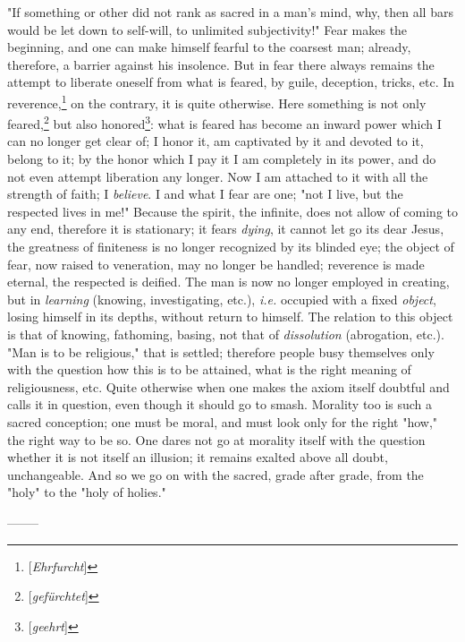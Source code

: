  "{}If something or other did not rank as sacred in a man's mind, why, then 
all bars would be let down to self-will, to unlimited subjectivity!"{} Fear 
makes the beginning, and one can make himself fearful to the coarsest man; 
already, therefore, a barrier against his insolence. But in fear there always 
remains the attempt to liberate oneself from what is feared, by guile, 
deception, tricks, etc. In reverence,\footnote{[\textit{Ehrfurcht}]} on the 
contrary, it is quite otherwise. Here something is not only 
feared,\footnote{[\textit{gef\"urchtet}]} but also 
honored\footnote{[\textit{geehrt}]}: what is feared has become an inward power 
which I can no longer get clear of; I honor it, am captivated by it and 
devoted to it, belong to it; by the honor which I pay it I am completely in 
its power, and do not even attempt liberation any longer. Now I am attached to 
it with all the strength of faith; I \textit{believe}. I and what I fear are 
one; "{}not I live, but the respected lives in me!"{} Because the spirit, the 
infinite, does not allow of coming to any end, therefore it is stationary; it 
fears \textit{dying}, it cannot let go its dear Jesus, the greatness of 
finiteness is no longer recognized by its blinded eye; the object of fear, now 
raised to veneration, may no longer be handled; reverence is made eternal, the 
respected is deified. The man is now no longer employed in creating, but in 
\textit{learning} (knowing, investigating, etc.), \textit{i.e.} occupied with 
a fixed \textit{object}, losing himself in its depths, without return to 
himself. The relation to this object is that of knowing, fathoming, basing, 
not that of \textit{dissolution} (abrogation, etc.). "{}Man is to be 
religious,"{} that is settled; therefore people busy themselves only with the 
question how this is to be attained, what is the right meaning of 
religiousness, etc. Quite otherwise when one makes the axiom itself doubtful 
and calls it in question, even though it should go to smash. Morality too is 
such a sacred conception; one must be moral, and must look only for the right 
"{}how,"{} the right way to be so. One dares not go at morality itself with 
the question whether it is not itself an illusion; it remains exalted above 
all doubt, unchangeable. And so we go on with the sacred, grade after grade, 
from the "{}holy"{} to the "{}holy of holies."{}

\begin{center}
--------\end{center}


